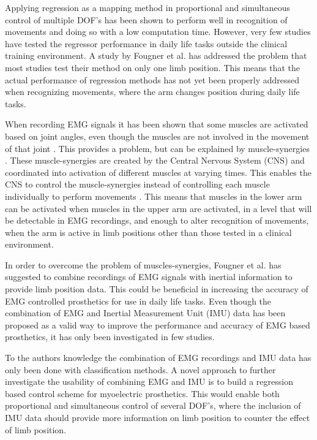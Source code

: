 \begin{multicols}{2}
Applying regression as a mapping method in proportional and simultaneous control of multiple DOF's has been shown to perform well in recognition of movements and doing so with a low computation time. \cite{hahne2014} However, very few studies have tested the regressor performance in daily life tasks outside the clinical training environment. \cite{jiang2012} A study by Fougner et al. \cite{Fougner2011} has addressed the problem that most studies test their method on only one limb position. This means that the actual performance of regression methods has not yet been properly addressed when recognizing movements, where the arm changes position during daily life tasks. 

When recording EMG signals it has been shown that some muscles are activated based on joint angles, even though the muscles are not involved in the movement of that joint \cite{Fougner2011}. This provides a problem, but can be explained by muscle-synergies \cite{DeRugy2013}. These muscle-synergies are created by the Central Nervous System (CNS) and coordinated into activation of different muscles at varying times. This enables the CNS to control the muscle-synergies instead of controlling each muscle individually to perform movements \cite{jiang2009}. This means that muscles in the lower arm can be activated when muscles in the upper arm are activated, in a level that will be detectable in EMG recordings, and enough to alter recognition of movements, when the arm is active in limb positions other than those tested in a clinical environment. 

In order to overcome the problem of muscles-synergies, Fougner et al. \cite{Fougner2011} has suggested to combine recordings of EMG signals with inertial information to provide limb position data. This could be beneficial in increasing the accuracy of EMG controlled prosthetics for use in daily life tasks. 
Even though the combination of EMG and Inertial Measurement Unit (IMU) data has been proposed as a valid way to improve the performance and accuracy of EMG based prosthetics, it has only been investigated in few studies. \cite{Roy2010, Imtiaz2014, jiang2012}

To the authors knowledge the combination of EMG recordings and IMU data has only been done with classification methods. A novel approach to further investigate the usability of combining EMG and IMU is to build a regression based control scheme for myoelectric prosthetics. This would enable both proportional and simultaneous control of several DOF's, where the inclusion of IMU data should provide more information on limb position to counter the effect of limb position.		
	

\end{multicols}
